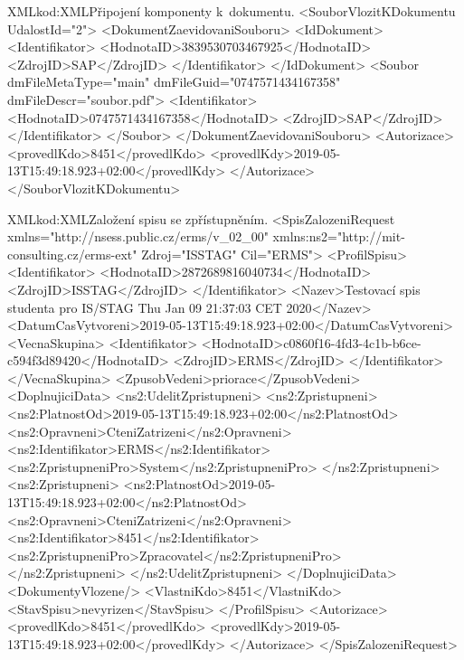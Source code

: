 \documentclass[
  master,
  field=ainfp,
  biblatex,
  language=czech,
  glossaries,
  theorems=false,
  index
]{kidiplom}
\begin{document}
\begin{kicode}{XML}{kod:XML}{Připojení komponenty k~dokumentu.}
<SouborVlozitKDokumentu UdalostId="2">
    <DokumentZaevidovaniSouboru>
        <IdDokument>
            <Identifikator>
                <HodnotaID>3839530703467925</HodnotaID>
                <ZdrojID>SAP</ZdrojID>
            </Identifikator>
        </IdDokument>
        <Soubor dmFileMetaType="main" dmFileGuid="0747571434167358" dmFileDescr="soubor.pdf">
            <Identifikator>
                <HodnotaID>0747571434167358</HodnotaID>
                <ZdrojID>SAP</ZdrojID>
            </Identifikator>
        </Soubor>
    </DokumentZaevidovaniSouboru>
    <Autorizace>
        <provedlKdo>8451</provedlKdo>
        <provedlKdy>2019-05-13T15:49:18.923+02:00</provedlKdy>
    </Autorizace>
</SouborVlozitKDokumentu>
\end{kicode}

\begin{kicode}{XML}{kod:XML}{Založení spisu se zpřístupněním.}
<SpisZalozeniRequest xmlns="http://nsess.public.cz/erms/v_02_00" 
    xmlns:ns2="http://mit-consulting.cz/erms-ext" Zdroj="ISSTAG" Cil="ERMS">
    <ProfilSpisu>
        <Identifikator>
            <HodnotaID>2872689816040734</HodnotaID>
            <ZdrojID>ISSTAG</ZdrojID>
        </Identifikator>
        <Nazev>Testovací spis studenta pro IS/STAG Thu Jan 09 21:37:03 CET 2020</Nazev>
        <DatumCasVytvoreni>2019-05-13T15:49:18.923+02:00</DatumCasVytvoreni>
        <VecnaSkupina>
            <Identifikator>
                <HodnotaID>c0860f16-4fd3-4c1b-b6ce-c594f3d89420</HodnotaID>
                <ZdrojID>ERMS</ZdrojID>
            </Identifikator>
        </VecnaSkupina>
        <ZpusobVedeni>priorace</ZpusobVedeni>
        <DoplnujiciData>
            <ns2:UdelitZpristupneni>
                <ns2:Zpristupneni>
                    <ns2:PlatnostOd>2019-05-13T15:49:18.923+02:00</ns2:PlatnostOd>
                    <ns2:Opravneni>CteniZatrizeni</ns2:Opravneni>
                    <ns2:Identifikator>ERMS</ns2:Identifikator>
                    <ns2:ZpristupneniPro>System</ns2:ZpristupneniPro>
                </ns2:Zpristupneni>
                <ns2:Zpristupneni>
                    <ns2:PlatnostOd>2019-05-13T15:49:18.923+02:00</ns2:PlatnostOd>
                    <ns2:Opravneni>CteniZatrizeni</ns2:Opravneni>
                    <ns2:Identifikator>8451</ns2:Identifikator>
                    <ns2:ZpristupneniPro>Zpracovatel</ns2:ZpristupneniPro>
                </ns2:Zpristupneni>
            </ns2:UdelitZpristupneni>
        </DoplnujiciData>
        <DokumentyVlozene/>
        <VlastniKdo>8451</VlastniKdo>
        <StavSpisu>nevyrizen</StavSpisu>
    </ProfilSpisu>
    <Autorizace>
        <provedlKdo>8451</provedlKdo>
        <provedlKdy>2019-05-13T15:49:18.923+02:00</provedlKdy>
    </Autorizace>
</SpisZalozeniRequest>
\end{kicode}
\end{document}
